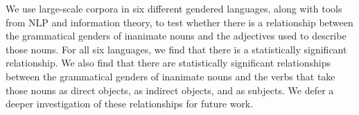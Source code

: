 We use large-scale corpora in six different gendered languages, along with tools from NLP and information theory, to test whether there is a relationship between the grammatical genders of inanimate nouns and the adjectives used to describe those nouns. For all six languages, we find that there is a statistically significant relationship. We also find that there are statistically significant relationships between the grammatical genders of inanimate nouns and the verbs that take those nouns as direct objects, as indirect objects, and as subjects. We defer a deeper investigation of these relationships for future work.